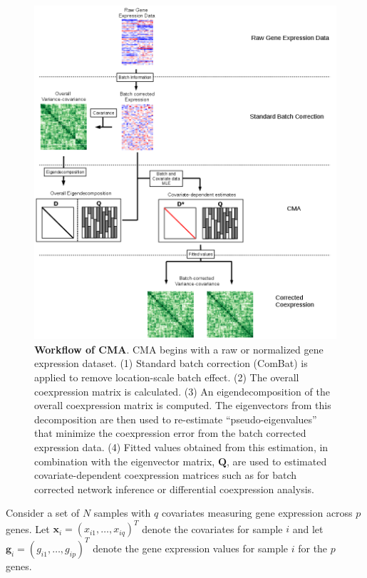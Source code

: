\begin{figure}
\includegraphics[width=1\columnwidth]{figures/overview2}\caption[Workflow of CMA]{\textbf{Workflow of CMA}. CMA begins with a raw or normalized
gene expression dataset. (1) Standard batch correction (ComBat) is
applied to remove location-scale batch effect. (2) The overall coexpression
matrix is calculated. (3) An eigendecomposition of the overall coexpression
matrix is computed. The eigenvectors from this decomposition are then
used to re-estimate ``pseudo-eigenvalues'' that minimize the coexpression
error from the batch corrected expression data. (4) Fitted values
obtained from this estimation, in combination with the eigenvector
matrix, $\mathbf{Q}$, are used to estimated covariate-dependent coexpression
matrices such as for batch corrected network inference or differential
coexpression analysis.}
\end{figure}

Consider a set of $N$ samples with $q$ covariates measuring gene
expression across $p$ genes. Let $\textbf{x}_{i}=(x_{i1},\dots,x_{iq})^{T}$
denote the covariates for sample $i$ and let $\textbf{g}_{i}=(g_{i1},\dots,g_{ip})^T$
denote the gene expression values for sample $i$ for the $p$ genes.

